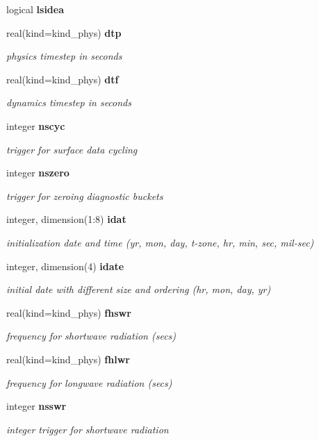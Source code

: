 \begin{DoxyCompactItemize}
logical \textbf{ lsidea}
\item 
real(kind=kind\+\_\+phys) \textbf{ dtp}
\begin{DoxyCompactList}\small\item\em physics timestep in seconds \end{DoxyCompactList}\item 
real(kind=kind\+\_\+phys) \textbf{ dtf}
\begin{DoxyCompactList}\small\item\em dynamics timestep in seconds \end{DoxyCompactList}\item 
integer \textbf{ nscyc}
\begin{DoxyCompactList}\small\item\em trigger for surface data cycling \end{DoxyCompactList}\item 
integer \textbf{ nszero}
\begin{DoxyCompactList}\small\item\em trigger for zeroing diagnostic buckets \end{DoxyCompactList}\item 
integer, dimension(1\+:8) \textbf{ idat}
\begin{DoxyCompactList}\small\item\em initialization date and time (yr, mon, day, t-\/zone, hr, min, sec, mil-\/sec) \end{DoxyCompactList}\item 
integer, dimension(4) \textbf{ idate}
\begin{DoxyCompactList}\small\item\em initial date with different size and ordering (hr, mon, day, yr) \end{DoxyCompactList}\item 
real(kind=kind\+\_\+phys) \textbf{ fhswr}
\begin{DoxyCompactList}\small\item\em frequency for shortwave radiation (secs) \end{DoxyCompactList}\item 
real(kind=kind\+\_\+phys) \textbf{ fhlwr}
\begin{DoxyCompactList}\small\item\em frequency for longwave radiation (secs) \end{DoxyCompactList}\item 
integer \textbf{ nsswr}
\begin{DoxyCompactList}\small\item\em integer trigger for shortwave radiation \end{DoxyCompactList}\item 

\end{DoxyCompactItemize}
